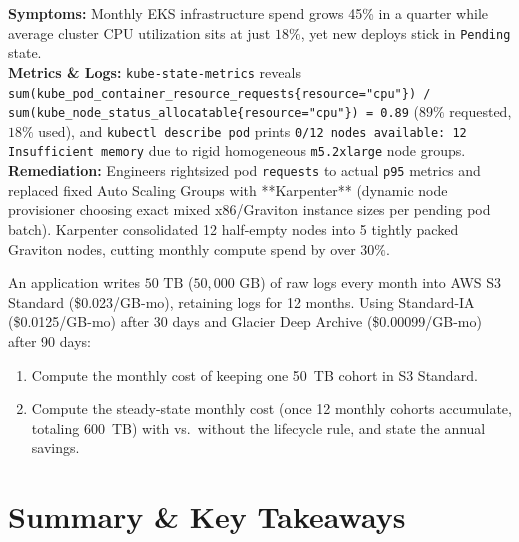 \begin{realworldbox}
\textbf{Symptoms:} Monthly EKS infrastructure spend grows 45\% in a quarter while average cluster CPU utilization sits at just $18\%$, yet new deploys stick in \texttt{Pending} state.\\
\textbf{Metrics \& Logs:} \texttt{kube-state-metrics} reveals \texttt{sum(kube\_pod\_container\_resource\_requests\{resource="cpu"\}) / sum(kube\_node\_status\_allocatable\{resource="cpu"\}) = 0.89} ($89\%$ requested, $18\%$ used), and \texttt{kubectl describe pod} prints \texttt{0/12 nodes available: 12 Insufficient memory} due to rigid homogeneous \texttt{m5.2xlarge} node groups.\\
\textbf{Remediation:} Engineers rightsized pod \texttt{requests} to actual \texttt{p95} metrics and replaced fixed Auto Scaling Groups with **Karpenter** (dynamic node provisioner choosing exact mixed x86/Graviton instance sizes per pending pod batch). Karpenter consolidated 12 half-empty nodes into 5 tightly packed Graviton nodes, cutting monthly compute spend by over $30\%$.
\end{realworldbox}

\begin{tryityourselfbox}
An application writes $50\text{ TB}$ ($50,000\text{ GB}$) of raw logs every month into AWS S3 Standard (\$0.023/GB-mo), retaining logs for 12 months. Using Standard-IA (\$0.0125/GB-mo) after 30 days and Glacier Deep Archive (\$0.00099/GB-mo) after 90 days:
\begin{enumerate}
  \item Compute the monthly cost of keeping one 50~TB cohort in S3 Standard.
  \item Compute the steady-state monthly cost (once 12 monthly cohorts accumulate, totaling 600~TB) with vs.\ without the lifecycle rule, and state the annual savings.
\end{enumerate}
\end{tryityourselfbox}

\section{Summary \protect\& Key Takeaways}


